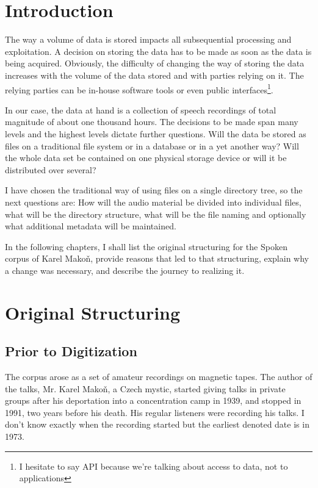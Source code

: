 
\begin{abstract}
\end{abstract}

\section{Introduction}

The way a volume of data is stored impacts all subsequential processing and
exploitation. A decision on storing the data has to be made as soon as the data
is being acquired. Obviously, the difficulty of changing the way of storing the
data increases with the volume of the data stored and with parties relying on
it. The relying parties can be in-house software tools or even public
interfaces\footnote{I hesitate to say API because we're talking about access to
data, not to applications}.

In our case, the data at hand is a collection of speech recordings of total
magnitude of about one thousand hours. The decisions to be made span many
levels and the highest levels dictate further questions. Will the data be stored
as files on a traditional file system or in a database or in a yet another way?
Will the whole data set be contained on one physical storage device or will it
be distributed over several?

I have chosen the traditional way of using files on a single directory tree, so
the next questions are: How will the audio material be divided into individual
files, what will be the directory structure, what will be the file naming and
optionally what additional metadata will be maintained.

In the following chapters, I shall list the original structuring for the Spoken
corpus of Karel Makoň, provide reasons that led to that structuring, explain why
a change was necessary, and describe the journey to realizing it.

\section{Original Structuring}

\subsection{Prior to Digitization}

The corpus arose as a set of amateur recordings on magnetic tapes. The author of
the talks, Mr. Karel Makoň, a Czech mystic, started giving talks in private
groups after his deportation into a concentration camp in 1939, and stopped in
1991, two years before his death. His regular listeners were recording his
talks. I don't know exactly when the recording started but the earliest denoted
date is in 1973.

